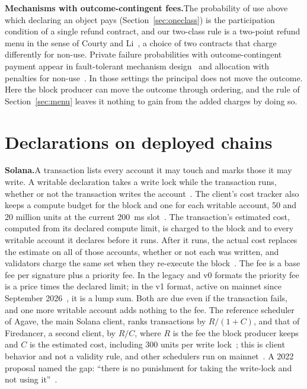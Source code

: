\documentclass[conference,compsoc]{IEEEtran}
\numberwithin{equation}{section}
\theoremstyle{plain}
\theoremstyle{definition}
\theoremstyle{remark}
\newcommand{\runin}[1]{\par\smallskip\noindent\textbf{#1.}\enspace}
\begin{document}
\runin{Mechanisms with outcome-contingent fees}The probability of use above which declaring an object pays (Section~\ref{sec:oneclass}) is the participation condition of a single refund contract, and our two-class rule is a two-point refund menu in the sense of Courty and Li~\cite{courty2000sequential}, a choice of two contracts that charge differently for non-use. Private failure probabilities with outcome-contingent payment appear in fault-tolerant mechanism design~\cite{porter2008fault} and allocation with penalties for non-use~\cite{ma2019contingent}. In those settings the principal does not move the outcome. Here the block producer can move the outcome through ordering, and the rule of Section~\ref{sec:menu} leaves it nothing to gain from the added charges by doing so.

\section{Declarations on deployed chains}\label{sec:chains}



\runin{Solana}A transaction lists every account it may touch and marks those it may write. A writable declaration takes a write lock while the transaction runs, whether or not the transaction writes the account~\cite{agave}. The client's cost tracker also keeps a compute budget for the block and one for each writable account, 50 and 20 million units at the current 200~ms slot~\cite{simd0525}. The transaction's estimated cost, computed from its declared compute limit, is charged to the block and to every writable account it declares before it runs. After it runs, the actual cost replaces the estimate on all of those accounts, whether or not each was written, and validators charge the same set when they re-execute the block~\cite{agave}. The fee is a base fee per signature plus a priority fee. In the legacy and v0 formats the priority fee is a price times the declared limit; in the v1 format, active on mainnet since September 2026~\cite{simd0385}, it is a lump sum. Both are due even if the transaction fails, and one more writable account adds nothing to the fee. The reference scheduler of Agave, the main Solana client, ranks transactions by $R/(1+C)$, and that of Firedancer, a second client, by $R/C$, where $R$ is the fee the block producer keeps and $C$ is the estimated cost, including 300 units per write lock~\cite{agave,firedancer}; this is client behavior and not a validity rule, and other schedulers run on mainnet~\cite{simd605}. A 2022 proposal named the gap: ``there is no punishment for taking the write-lock and not using it''~\cite{simd0016}.
\end{document}
